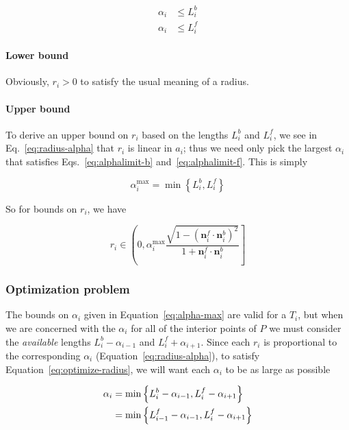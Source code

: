 \documentclass{article}
\begin{document}
\begin{align}
  \label{eq:alphalimit-b}
  \alpha_i &\le L^{b}_{i}\\
  \label{eq:alphalimit-f}
  \alpha_i &\le L^{f}_{i}
\end{align}

\paragraph{Lower bound}

Obviously, $r_i > 0$ to satisfy the usual meaning of a radius.

\paragraph{Upper bound}

To derive an upper bound on $r_{i}$ based on the lengths $L^b_i$ and $L^f_i$, we see in Eq.~\eqref{eq:radius-alpha} that $r_{i}$ is linear in $a_{i}$; thus we need only pick the largest $\alpha_i$ that satisfies Eqs.~\eqref{eq:alphalimit-b} and~\eqref{eq:alphalimit-f}.  This is simply

\begin{equation}
  \label{eq:alpha-max}
  \alpha^{\max}_i = \min \left\{L^{b}_{i}, L^{f}_{i}\right\}
\end{equation}

So for bounds on $r_{i}$, we have

\begin{equation}
  \label{eq:rbounds}
  r_{i} \in \left(0, \alpha^{\max}_i \frac{\sqrt{1-\left(\mathbf{n}^f_i\cdot \mathbf{n}^b_i\right)^{2}}}{1+\mathbf{n}^f_i\cdot \mathbf{n}^b_i}\right]
\end{equation}

\subsubsection{Optimization problem}
\label{sec:optimization}

The bounds on $\alpha_i$ given in Equation~\eqref{eq:alpha-max} are valid for a $T_{i}$, but when we are concerned with the $\alpha_i$ for all of the interior points of $P$ we must consider the \emph{available} lengths $L^{b}_{i}-\alpha_{i-1}$ and $L^{f}_{i}+\alpha_{i+1}$.  Since each $r_{i}$ is proportional to the corresponding $\alpha_i$ (Equation~\eqref{eq:radius-alpha}), to satisfy Equation~\eqref{eq:optimize-radius}, we will want each $\alpha_i$ to be as large as possible

\begin{align}
  \notag
  \alpha_i &= \min \left\{L^{b}_{i}-\alpha_{i-1}, L^{f}_{i}-\alpha_{i+1}\right\} \\
  \label{eq:alpha-optimize}
  &= \min \left\{L^{f}_{i-1}-\alpha_{i-1}, L^{f}_{i}-\alpha_{i+1}\right\}
\end{align}
\end{document}
